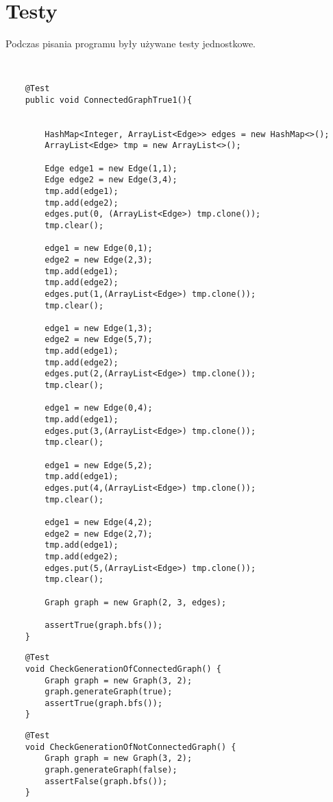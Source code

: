 \documentclass[]{article}
\begin{document}
\section{Testy}\label{header-n233}
Podczas pisania programu były używane testy jednostkowe.
\begin{verbatim}
    

    @Test
    public void ConnectedGraphTrue1(){


        HashMap<Integer, ArrayList<Edge>> edges = new HashMap<>();
        ArrayList<Edge> tmp = new ArrayList<>();

        Edge edge1 = new Edge(1,1);
        Edge edge2 = new Edge(3,4);
        tmp.add(edge1);
        tmp.add(edge2);
        edges.put(0, (ArrayList<Edge>) tmp.clone());
        tmp.clear();

        edge1 = new Edge(0,1);
        edge2 = new Edge(2,3);
        tmp.add(edge1);
        tmp.add(edge2);
        edges.put(1,(ArrayList<Edge>) tmp.clone());
        tmp.clear();

        edge1 = new Edge(1,3);
        edge2 = new Edge(5,7);
        tmp.add(edge1);
        tmp.add(edge2);
        edges.put(2,(ArrayList<Edge>) tmp.clone());
        tmp.clear();

        edge1 = new Edge(0,4);
        tmp.add(edge1);
        edges.put(3,(ArrayList<Edge>) tmp.clone());
        tmp.clear();

        edge1 = new Edge(5,2);
        tmp.add(edge1);
        edges.put(4,(ArrayList<Edge>) tmp.clone());
        tmp.clear();

        edge1 = new Edge(4,2);
        edge2 = new Edge(2,7);
        tmp.add(edge1);
        tmp.add(edge2);
        edges.put(5,(ArrayList<Edge>) tmp.clone());
        tmp.clear();

        Graph graph = new Graph(2, 3, edges);

        assertTrue(graph.bfs());
    }
\end{verbatim}
\begin{verbatim}
    @Test
    void CheckGenerationOfConnectedGraph() {
        Graph graph = new Graph(3, 2);
        graph.generateGraph(true);
        assertTrue(graph.bfs());
    }
\end{verbatim}
\begin{verbatim}
    @Test
    void CheckGenerationOfNotConnectedGraph() {
        Graph graph = new Graph(3, 2);
        graph.generateGraph(false);
        assertFalse(graph.bfs());
    }
\end{verbatim}
\end{document}
